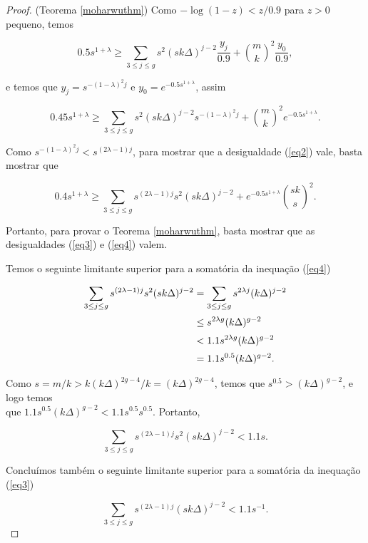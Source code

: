 \begin{proof}{(Teorema \ref{moharwuthm})}
Como $-\log(1-z) < z/0.9$ para $z>0$ pequeno, temos

\[0.5s^{1+\lambda} \geq \sum_{3\leq j \leq g} s^2(sk\Delta)^{j-2}\frac{y_j}{0.9} + \binom{m}{k}^2\frac{y_0}{0.9},\]

e temos que $y_j = s^{-(1-\lambda)^2j}$ e $y_0 = e^{-0.5s^{1+\lambda}}$, assim

\[0.45s^{1+\lambda} \geq \sum_{3\leq j \leq g} s^2(sk\Delta)^{j-2} s^{-(1-\lambda)^2j} + \binom{m}{k}^2e^{-0.5s^{1+\lambda}}.\]

Como $s^{-(1-\lambda)^2j} < s^{(2\lambda - 1)j}$, para mostrar que a desigualdade (\ref{eq2}) vale, basta mostrar que

\begin{equation}\label{eq4}
0.4s^{1+\lambda} \geq \sum_{3\leq j\leq g}s^{(2\lambda-1)j}s^2(sk\Delta)^{j-2}+e^{-0.5s^{1+\lambda}}\binom{sk}{s}^2.
\end{equation}

Portanto, para provar o Teorema \ref{moharwuthm}, basta mostrar que as desigualdades (\ref{eq3}) e (\ref{eq4}) valem.

Temos o seguinte limitante superior para a somatória da inequação (\ref{eq4})

\begin{equation*}
\setlength{\jot}{5pt}
\begin{aligned}
\sum_{3\leq j\leq g}s^{(2\lambda-1)j}s^2(sk\Delta)^{j-2} & = \sum_{3\leq j\leq g}s^{2\lambda j}(k\Delta)^{j-2} \\
 & \leq s^{2\lambda g}(k\Delta)^{g-2} \\
 & < 1.1s^{2\lambda g}(k\Delta)^{g-2} \\
 & = 1.1s^{0.5}(k\Delta)^{g-2}.
\end{aligned}
\end{equation*}

Como $s = m/k > k(k\Delta)^{2g-4}/k = (k\Delta)^{2g-4}$, temos que $s^{0.5} > (k\Delta)^{g-2}$, e logo temos \\que $1.1s^{0.5}(k\Delta)^{g-2} < 1.1s^{0.5}s^{0.5}$. Portanto,

\begin{equation*}
\sum_{3\leq j\leq g}s^{(2\lambda-1)j}s^2(sk\Delta)^{j-2} < 1.1s.
\end{equation*}

Concluímos também o seguinte limitante superior para a somatória da inequação (\ref{eq3})

\begin{equation*}
\sum_{3\leq j\leq g}s^{(2\lambda-1)j}(sk\Delta)^{j-2} < 1.1s^{-1}.
\end{equation*}


\end{proof}
